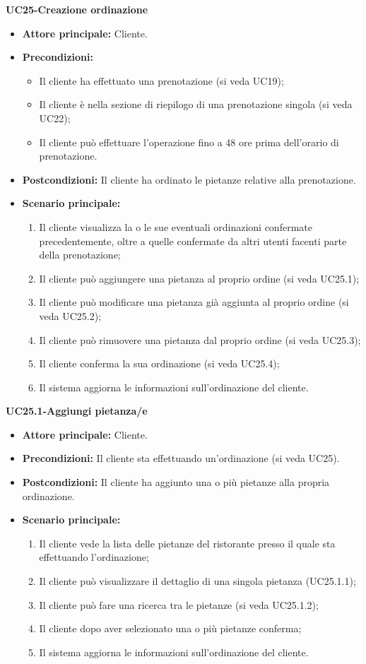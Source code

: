 \textbf{UC25-Creazione ordinazione}
\begin{itemize}
\item \textbf{Attore principale:} Cliente.
\item \textbf{Precondizioni:} 
\begin{itemize}
    \item Il cliente ha effettuato una prenotazione (si veda UC19);
    \item Il cliente è nella sezione di riepilogo di una prenotazione singola (si veda UC22);
    \item Il cliente può effettuare l'operazione fino a 48 ore prima dell'orario di prenotazione.
\end{itemize}
\item \textbf{Postcondizioni:} Il cliente ha ordinato le pietanze relative alla prenotazione.
\item \textbf{Scenario principale:}
\begin{enumerate}
    \item Il cliente visualizza la o le sue eventuali ordinazioni confermate precedentemente, oltre a quelle confermate da altri utenti facenti parte della prenotazione;
    \item Il cliente può aggiungere una pietanza al proprio ordine (si veda UC25.1);
    \item Il cliente può modificare una pietanza già aggiunta al proprio ordine (si veda UC25.2);
    \item Il cliente può rimuovere una pietanza dal proprio ordine (si veda UC25.3);
    \item Il cliente conferma la sua ordinazione (si veda UC25.4);
    \item Il sistema aggiorna le informazioni sull'ordinazione del cliente.
\end{enumerate}
\end{itemize}

\textbf{UC25.1-Aggiungi pietanza/e}
\begin{itemize}
\item \textbf{Attore principale:} Cliente.
\item \textbf{Precondizioni:} Il cliente sta effettuando un'ordinazione (si veda UC25).
\item \textbf{Postcondizioni:} Il cliente ha aggiunto una o più pietanze alla propria ordinazione.
\item \textbf{Scenario principale:}
\begin{enumerate}
    \item Il cliente vede la lista delle pietanze del ristorante presso il quale sta effettuando l'ordinazione;
    \item Il cliente può visualizzare il dettaglio di una singola pietanza (UC25.1.1);
    \item Il cliente può fare una ricerca tra le pietanze (si veda UC25.1.2);
    \item Il cliente dopo aver selezionato una o più pietanze conferma;
    \item Il sistema aggiorna le informazioni sull'ordinazione del cliente.
\end{enumerate}
\end{itemize}

